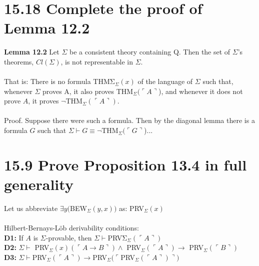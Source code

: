 \documentclass{article}
\begin{document}
\section*{15.18 Complete the proof of Lemma 12.2}
\textbf{Lemma 12.2} Let $\Sigma$ be a consistent theory containing Q. Then the set of
$\Sigma$'s theorems, $Cl(\Sigma)$, is not representable in $\Sigma$.\\\\
That is: There is no formula THMΣ$_\Sigma(x)$ of the language of $\Sigma$ such that,
whenever $\Sigma$ proves A, it also proves THM$_\Sigma(\ulcorner A \urcorner$), and whenever it does
not prove $A$, it proves $\neg$THM$_\Sigma(\ulcorner A \urcorner)$.\\\\
Proof. Suppose there were such a formula. Then by the diagonal lemma
there is a formula $G$ such that
$\Sigma \vdash G \equiv \neg$THM$_\Sigma(\ulcorner G \urcorner$)...\\
\section*{15.9 Prove Proposition 13.4 in full generality}
Let us
abbreviate $\exists y($BEW$_\Sigma(y, x))$ as: PRV$_\Sigma(x)$\\\\
Hilbert-Bernays-L\"ob derivability conditions:\\
\textbf{D1:} If $A$ is $\Sigma$-provable, then $\Sigma \vdash $PRVΣ$_\Sigma(\ulcorner A \urcorner)$\\
\textbf{D2:} $\Sigma \vdash$ PRV$_\Sigma(x)(\ulcorner A \rightarrow B \urcorner) \wedge$ PRV$_\Sigma(\ulcorner A \urcorner) \rightarrow$ PRV$_\Sigma(\ulcorner B \urcorner)$\\
\textbf{D3:} $\Sigma \vdash $PRV$_\Sigma(\ulcorner A \urcorner) \rightarrow $PRV$_\Sigma(\ulcorner$PRV$_\Sigma(\ulcorner A \urcorner)\urcorner)$\\\\
\end{document}
